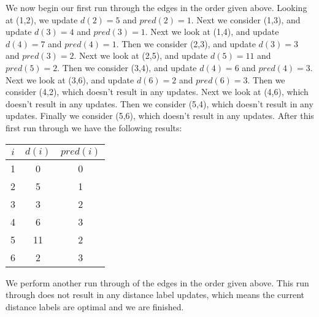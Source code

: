 \documentclass[10pt]{article}
\begin{document}
We now begin our first run through the edges in the order given above.  Looking at (1,2), we update $d(2)=5$ and $pred(2)=1$.  Next we consider (1,3), and update $d(3)=4$ and $pred(3)=1$.  Next we look at (1,4), and update $d(4)=7$ and $pred(4)=1$.  Then we consider (2,3), and update $d(3)=3$ and $pred(3)=2$.  Next we look at (2,5), and update $d(5)=11$ and $pred(5)=2$.  Then we consider (3,4), and update $d(4)=6$ and $pred(4)=3$.  Next we look at (3,6), and update $d(6)=2$ and $pred(6)=3$.  Then we consider (4,2), which doesn't result in any updates.  Next we look at (4,6), which doesn't result in any updates.  Then we consider (5,4), which doesn't result in any updates.  Finally we consider (5,6), which doesn't result in any updates.  After this first run through we have the following results:

 \begin{center}
  \begin{tabular}{c|c|c}
    $i$ & $d(i)$ & $pred(i)$ \\ \hline
    1 & 0 & 0  \\ \hline
    2 & 5 & 1  \\ \hline
    3 & 3 & 2  \\ \hline
    4 & 6 & 3  \\ \hline
    5 & 11 & 2  \\ \hline
    6 & 2 & 3  \\ \hline
  \end{tabular}
  \end{center}

We perform another run through of the edges in the order given above.  This run through does not result in any distance label updates, which means the current distance labels are optimal and we are finished.
  
\end{document}
